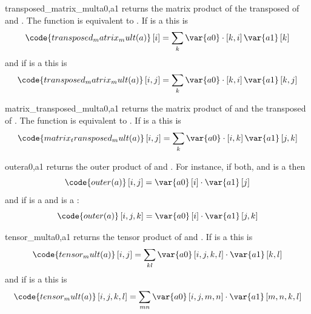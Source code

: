 \begin{funcdesc}{transposed_matrix_mult}{a0,a1}
returns the matrix product of the transposed of  and .
The function is equivalent to .
If  is a \RankOne this is
\begin{equation}
\code{transposed_matrix_mult(a)}\left[i\right]=\sum_{k}\var{a0}  \cdot \left[k,i\right]\var{a1} \left[k\right]
\end{equation}
and if  is a \RankTwo this is
\begin{equation}
\code{transposed_matrix_mult(a)}\left[i,j\right]=\sum_{k}\var{a0}  \cdot \left[k,i\right]\var{a1} \left[k,j\right]
\end{equation}
\end{funcdesc}

\begin{funcdesc}{matrix_transposed_mult}{a0,a1}
returns the matrix product of  and the transposed of .
The function is equivalent to .
If  is a \RankTwo this is
\begin{equation}
\code{matrix_transposed_mult(a)}\left[i,j\right]=\sum_{k}\var{a0}  \cdot \left[i,k\right]\var{a1} \left[j,k\right]
\end{equation}
\end{funcdesc}

\begin{funcdesc}{outer}{a0,a1}
returns the outer product of  and .
For instance, if both,  and  is a \RankOne then
\begin{equation}
\code{outer(a)}\left[i,j\right]=\var{a0} \left[i\right]  \cdot  \var{a1}\left[j\right]
\end{equation}
and if  is a \RankOne and  is a \RankThree:
\begin{equation}
\code{outer(a)}\left[i,j,k\right]=\var{a0} \left[i\right] \cdot \var{a1}\left[j,k\right]
\end{equation}
\end{funcdesc}

\begin{funcdesc}{tensor_mult}{a0,a1}
returns the tensor product of  and .
If  is a \RankTwo this is
\begin{equation}
\code{tensor_mult(a)}\left[i,j\right]=\sum_{kl}\var{a0}\left[i,j,k,l\right] \cdot \var{a1} \left[k,l\right]
\end{equation}
and if  is a \RankFour this is
\begin{equation}
\code{tensor_mult(a)}\left[i,j,k,l\right]=\sum_{mn}\var{a0} \left[i,j,m,n\right] \cdot \var{a1} \left[m,n,k,l\right]
\end{equation}
\end{funcdesc}

